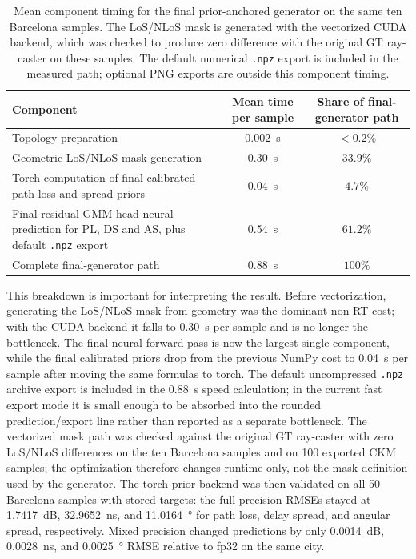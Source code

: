 \begin{table}[H]
\centering
\caption[Final-generator runtime component breakdown.]
{Mean component timing for the final prior-anchored generator on the same ten Barcelona
samples. The LoS/NLoS mask is generated with the vectorized CUDA backend,
which was checked to produce zero difference with the original GT ray-caster
on these samples. The default numerical \texttt{.npz} export is included in
the measured path; optional PNG exports are outside this component timing.}
\label{tab:try80_runtime_breakdown}
\scriptsize
\begin{tabularx}{\textwidth}{>{\raggedright\arraybackslash}Xcc}
\toprule
Component & Mean time per sample & Share of final-generator path \\
\midrule
Topology preparation & \SI{0.002}{s} & \(<0.2\%\) \\
Geometric LoS/NLoS mask generation & \SI{0.30}{s} & \(33.9\%\) \\
Torch computation of final calibrated path-loss and spread priors & \SI{0.04}{s} & \(4.7\%\) \\
Final residual GMM-head neural prediction for PL, DS and AS, plus default \texttt{.npz} export & \SI{0.54}{s} & \(61.2\%\) \\
\midrule
Complete final-generator path & \SI{0.88}{s} & \(100\%\) \\
\bottomrule
\end{tabularx}
\end{table}
\normalsize

This breakdown is important for interpreting the result. Before vectorization,
generating the LoS/NLoS mask from geometry was the dominant non-RT cost; with
the CUDA backend it falls to \SI{0.30}{s} per sample and is no longer the
bottleneck. The final neural forward pass is now the largest single component,
while the final calibrated priors drop from the previous NumPy cost to
\SI{0.04}{s} per sample after moving the same formulas to torch. The
default uncompressed \texttt{.npz} archive export is included in the
\SI{0.88}{s} speed calculation; in the current fast export mode it is small
enough to be absorbed into the rounded prediction/export line rather than
reported as a separate bottleneck. The vectorized mask path
was checked against the original GT ray-caster with zero LoS/NLoS differences
on the ten Barcelona samples and on 100 exported CKM samples; the optimization
therefore changes runtime only, not the mask definition used by the generator.
The torch prior backend was then validated on all 50 Barcelona samples with
stored targets: the full-precision RMSEs stayed at \SI{1.7417}{dB},
\SI{32.9652}{ns}, and \SI{11.0164}{\degree} for path loss, delay spread, and
angular spread, respectively. Mixed precision changed predictions by only
\SI{0.0014}{dB}, \SI{0.0028}{ns}, and \SI{0.0025}{\degree} RMSE relative to
fp32 on the same city.

